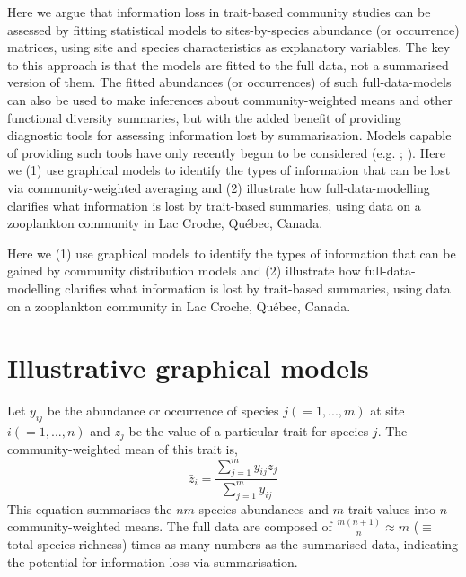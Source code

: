 \documentclass[12pt]{ecology}
\begin{document}
Here we argue that information loss in trait-based community studies can be assessed by fitting statistical models to sites-by-species abundance (or occurrence) matrices, using site and species characteristics as explanatory variables.  The key to this approach is that the models are fitted to the full data, not a summarised version of them.  The fitted abundances (or occurrences) of such full-data-models can also be used to make inferences about community-weighted means and other functional diversity summaries, but with the added benefit of providing diagnostic tools for assessing information lost by summarisation.  Models capable of providing such tools have only recently begun to be considered (e.g. ; ).  Here we (1) use graphical models to identify the types of information that can be lost via community-weighted averaging and (2) illustrate how full-data-modelling clarifies what information is lost by trait-based summaries, using data on a zooplankton community in Lac Croche, Qu\'{e}bec, Canada.


Here we (1) use graphical models to identify the types of information that can be gained by community distribution models and (2) illustrate how full-data-modelling clarifies what information is lost by trait-based summaries, using data on a zooplankton community in Lac Croche, Qu\'{e}bec, Canada.


\section{Illustrative graphical models}
\label{sec:graphmod}

Let $y_{ij}$ be the abundance or occurrence of species $j (= 1, ..., m)$ at site $i (= 1, ..., n)$ and $z_j$ be the value of a particular trait for species $j$.  The community-weighted mean of this trait is, \newpage
\begin{equation} 
\bar{z}_i = \frac{\sum_{j=1}^m y_{ij} z_j}{\sum_{j=1}^m y_{ij}}
\label{eq:cwmdef}
\end{equation}
This equation summarises the $nm$ species abundances and $m$ trait values into $n$ community-weighted means.  The full data are composed of $\frac{m(n + 1)}{n} \approx m$ ($\equiv$ total species richness) times as many numbers as the summarised data, indicating the potential for information loss via summarisation.
\end{document}
